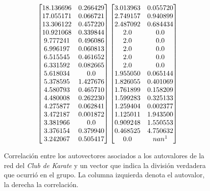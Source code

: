 \vspace{1em}
\begin{figure}[!htbp]
\begin{equation*} 
    \begin{bmatrix}
        18.136696 & 0.266429 \\
        17.055171 & 0.066721 \\
        13.306122 & 0.457220 \\
        10.921068 & 0.339844 \\
        9.777241  & 0.496086 \\
        6.996197  & 0.060813 \\
        6.515545  & 0.461652 \\
        6.331592  & 0.082665 \\
        5.618034  & 0.0 \\
        5.378595  & 1.427676 \\
        4.580793  & 0.465710 \\
        4.480008  & 0.262230 \\
        4.275877  & 0.062841 \\
        3.472187  & 0.001872 \\
        3.381966  & 0.0 \\
        3.376154  & 0.379940 \\
        3.242067  & 0.505417 
    \end{bmatrix}
    \begin{bmatrix}
        3.013963 & 0.055720 \\
        2.749157 & 0.940899 \\
        2.487092 & 0.684434 \\
        2.0 & 0.0 \\
        2.0 & 0.0 \\
        2.0 & 0.0 \\
        2.0 & 0.0 \\
        2.0 & 0.0 \\
        1.955050 & 0.065144 \\
        1.826055 & 0.401069 \\
        1.761899 & 0.158209 \\
        1.599283 & 0.325133 \\
        1.259404 & 0.002377 \\
        1.125011 & 1.943500 \\
        0.909248 & 1.550553 \\
        0.468525 & 4.750632 \\
        0.0 & nan\footnotemark
    \end{bmatrix}
\end{equation*}
\caption{Correlación entre los autovectores asociados a los autovalores de la red del \textit{Club de Karate} y un vector que indica la división verdadera que ocurrió en el grupo. La columna izquierda denota el autovalor, la derecha la correlación.} \label{conectividad_karate}
\end{figure}


